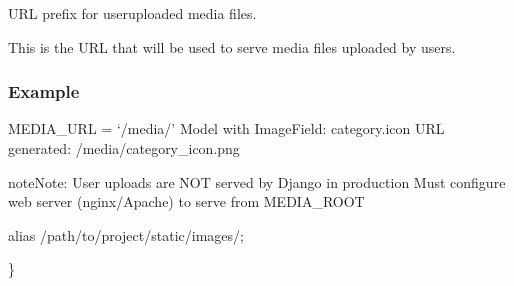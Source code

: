 \documentclass[letterpaper,10pt,english]{sphinxmanual}
\begin{document}
\begin{fulllineitems}
\label{\detokenize{softwareProject:softwareProject.settings.MEDIA_URL}}
\pysigstartsignatures
\pysigline
{}
\pysigstopsignatures
\sphinxAtStartPar
URL prefix for user\sphinxhyphen{}uploaded media files.

\sphinxAtStartPar
This is the URL that will be used to serve media files uploaded by users.
\subsubsection*{Example}

\sphinxAtStartPar
MEDIA\_URL = ‘/media/’
Model with ImageField: category.icon
URL generated: /media/category\_icon.png

\begin{sphinxadmonition}{note}{Note:}
\sphinxAtStartPar
User uploads are NOT served by Django in production
Must configure web server (nginx/Apache) to serve from MEDIA\_ROOT
\end{sphinxadmonition}
\begin{description}
\begin{description}
\sphinxAtStartPar
alias /path/to/project/static/images/;

\end{description}

\sphinxAtStartPar
\}

\end{description}

\end{fulllineitems}

\end{document}

